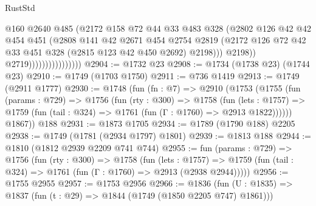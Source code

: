 \begin{lexlean}{RustStd}
\begin{coremodule}
                                      @160
                                      @2640
                                      @485
                                      (@2172
                                        @158
                                        @72
                                        @44
                                        @33
                                        @483
                                        @328
                                        (@2802
                                          @126
                                          @42
                                          @42
                                          @454
                                          @451
                                          (@2808
                                            @141
                                            @42
                                            @2671
                                            @454
                                            @2754
                                            @2819
                                            (@2172
                                              @126
                                              @72
                                              @42
                                              @33
                                              @451
                                              @328
                                              (@2815 @123 @42 @450 @2692)
                                              @2198)))
                                        @2198))
                                    @2719))))))))))))))))
@2904 := @1732 @23
@2908 := @1734 (@1738 @23) (@1744 @23)
@2910 := @1749 (@1703 @1750)
@2911 := @736 @1419
@2913 := @1749 (@2911 @1777)
@2930 := @1748
    (fun (fn : @7) =>
    @2910
      (@1753
        (@1755
          (fun (params : @729) =>
          @1756
            (fun (rty : @300) =>
            @1758
              (fun (lets : @1757) =>
              @1759 (fun (tail : @324) => @1761 (fun (Γ : @1760) => @2913 @1822))))))
        @1867))
    @188
@2931 := @1873 @1705
@2934 := @1789 (@1790 @188) @2205
@2938 := @1749 (@1781 (@2934 @1797) @1801)
@2939 := @1813 @188
@2944 := @1810 (@1812 @2939 @2209 @741 @744)
@2955 := fun (params : @729) =>
  @1756
    (fun (rty : @300) =>
    @1758
      (fun (lets : @1757) =>
      @1759 (fun (tail : @324) => @1761 (fun (Γ : @1760) => @2913 (@2938 @2944)))))
@2956 := @1755 @2955
@2957 := @1753 @2956
@2966 := @1836 (fun (U : @1835) => @1837 (fun (t : @29) => @1844 (@1749 (@1850 @2205 @747) @1861)))

\end{coremodule}
\end{lexlean}
